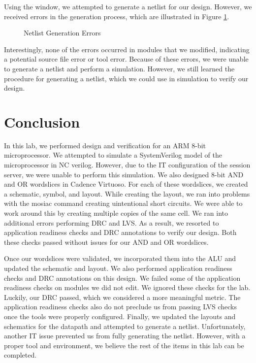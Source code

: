\documentclass{article}
\begin{document}
	\noindent Using the window, we attempted to generate a netlist for our design. However, we received errors in the generation process, which are illustrated in Figure \ref{fig::netlist_generation_errors}.
	
	\begin{figure}[H]
		\centerline{}
		\caption{Netlist Generation Errors}
		\label{fig::netlist_generation_errors}
	\end{figure}
	
	\noindent Interestingly, none of the errors occurred in modules that we modified, indicating a potential source file error or tool error. Because of these errors, we were unable to generate a netlist and perform a simulation. However, we still learned the procedure for generating a netlist, which we could use in simulation to verify our design.
	
	\section{Conclusion}
	
	In this lab, we performed design and verification for an ARM 8-bit microprocessor. We attempted to simulate a SystemVerilog model of the microprocessor in NC verilog. However, due to the IT configuration of the session server, we were unable to perform this simulation. We also designed 8-bit AND and OR wordslices in Cadence Virtuoso. For each of these wordslices, we created a schematic, symbol, and layout. While creating the layout, we ran into problems with the mosiac command creating uintentional short circuits. We were able to work around this by creating multiple copies of the same cell. We ran into additional errors performing DRC and LVS. As a result, we resorted to application readiness checks and DRC annotations to verify our design. Both these checks passed without issues for our AND and OR wordslices. 
	
	Once our wordslices were validated, we incorporated them into the ALU and updated the schematic and layout. We also performed application readiness checks and DRC annotations on this design. We failed some of the application readiness checks on modules we did not edit. We ignored these checks for the lab. Luckily, our DRC passed, which we considered a more meaningful metric. The application readiness checks also do not preclude us from passing LVS checks once the tools were properly configured. Finally, we updated the layouts and schematics for the datapath and attempted to generate a netlist. Unfortunately, another IT issue prevented us from fully generating the netlist. However, with a proper tool and environment, we believe the rest of the items in this lab can be completed.
	
\end{document}
